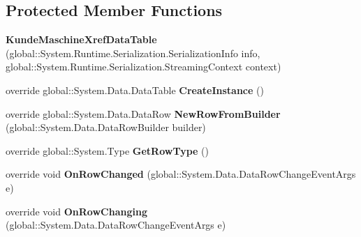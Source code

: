 \subsection*{Protected Member Functions}
\begin{DoxyCompactItemize}
\item 
{\bfseries Kunde\+Maschine\+Xref\+Data\+Table} (global\+::\+System.\+Runtime.\+Serialization.\+Serialization\+Info info, global\+::\+System.\+Runtime.\+Serialization.\+Streaming\+Context context)\hypertarget{class_products_1_1_data_1_1ds_sage_1_1_kunde_maschine_xref_data_table_a11bfae9fd25004798d59ac2fd29a2b3f}{}\label{class_products_1_1_data_1_1ds_sage_1_1_kunde_maschine_xref_data_table_a11bfae9fd25004798d59ac2fd29a2b3f}

\item 
override global\+::\+System.\+Data.\+Data\+Table {\bfseries Create\+Instance} ()\hypertarget{class_products_1_1_data_1_1ds_sage_1_1_kunde_maschine_xref_data_table_a4fda29fbcfe9699f968dfa823325fd9f}{}\label{class_products_1_1_data_1_1ds_sage_1_1_kunde_maschine_xref_data_table_a4fda29fbcfe9699f968dfa823325fd9f}

\item 
override global\+::\+System.\+Data.\+Data\+Row {\bfseries New\+Row\+From\+Builder} (global\+::\+System.\+Data.\+Data\+Row\+Builder builder)\hypertarget{class_products_1_1_data_1_1ds_sage_1_1_kunde_maschine_xref_data_table_ab47df6f9d75c21d0f83c466480497799}{}\label{class_products_1_1_data_1_1ds_sage_1_1_kunde_maschine_xref_data_table_ab47df6f9d75c21d0f83c466480497799}

\item 
override global\+::\+System.\+Type {\bfseries Get\+Row\+Type} ()\hypertarget{class_products_1_1_data_1_1ds_sage_1_1_kunde_maschine_xref_data_table_a811bd170fa862742ef5a89596ce8720e}{}\label{class_products_1_1_data_1_1ds_sage_1_1_kunde_maschine_xref_data_table_a811bd170fa862742ef5a89596ce8720e}

\item 
override void {\bfseries On\+Row\+Changed} (global\+::\+System.\+Data.\+Data\+Row\+Change\+Event\+Args e)\hypertarget{class_products_1_1_data_1_1ds_sage_1_1_kunde_maschine_xref_data_table_a430827a0bdb1eabe4211731ac775bebd}{}\label{class_products_1_1_data_1_1ds_sage_1_1_kunde_maschine_xref_data_table_a430827a0bdb1eabe4211731ac775bebd}

\item 
override void {\bfseries On\+Row\+Changing} (global\+::\+System.\+Data.\+Data\+Row\+Change\+Event\+Args e)\hypertarget{class_products_1_1_data_1_1ds_sage_1_1_kunde_maschine_xref_data_table_a5d35f39668c663bb232fef24def1a983}{}\label{class_products_1_1_data_1_1ds_sage_1_1_kunde_maschine_xref_data_table_a5d35f39668c663bb232fef24def1a983}


\end{DoxyCompactItemize}
